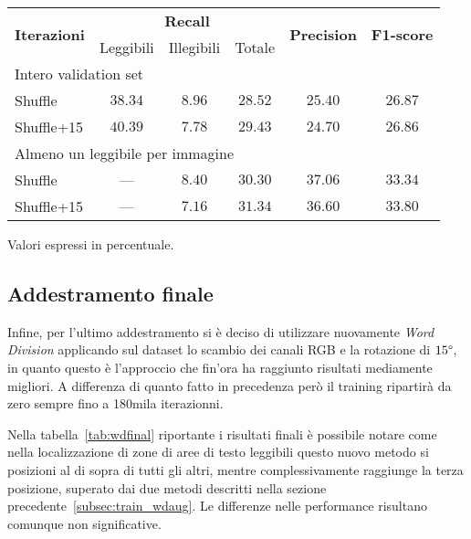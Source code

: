 \begin{table}[H]
\centering
\begin{threeparttable}
	\begin{tabular}{l*{5}c}
		\toprule
		\multirow{2}{*}{\textbf{Iterazioni}} & \multicolumn{3}{c}{\textbf{Recall}} & \multirow{2}{*}{\textbf{Precision}} & \multirow{2}{*}{\textbf{F1-score}} \\
		\cmidrule(lr){2-4}
		& Leggibili & Illegibili & Totale &  &  \\
		\midrule
		\multicolumn{6}{l}{Intero validation set} \\
		Shuffle		& $38.34$ & $8.96$ & $28.52$ & $25.40$ & $26.87$ \\
		Shuffle+15	& $40.39$ & $7.78$ & $29.43$ & $24.70$ & $26.86$ \\
		\midrule
		\multicolumn{6}{l}{Almeno un leggibile per immagine} \\
		Shuffle		&   ---   & $8.40$ & $30.30$ & $37.06$ & $33.34$ \\
		Shuffle+15	&   ---   & $7.16$ & $31.34$ & $36.60$ & $33.80$ \\
		\bottomrule
	\end{tabular}
	\begin{tablenotes}
		\item \footnotesize{Valori espressi in percentuale.}
	\end{tablenotes}
\end{threeparttable}
\caption{}\label{tab:wdaug}
\end{table}


\subsection{Addestramento finale}
\label{subsec:train_final}
Infine, per l'ultimo addestramento si è deciso di utilizzare nuovamente \textit{Word Division} applicando sul dataset lo scambio dei canali RGB e la rotazione di $15\text{\textdegree}$, in quanto questo è l'approccio che fin'ora ha raggiunto risultati mediamente migliori. A differenza di quanto fatto in precedenza però il training ripartirà da zero sempre fino a 180mila iterazionni.\par
Nella tabella~\ref{tab:wdfinal} riportante i risultati finali è possibile notare come nella localizzazione di zone di aree di testo leggibili questo nuovo metodo si posizioni al di sopra di tutti gli altri, mentre complessivamente raggiunge la terza posizione, superato dai due metodi descritti nella sezione precedente~\ref{subsec:train_wdaug}. Le differenze nelle performance risultano comunque non significative. 


